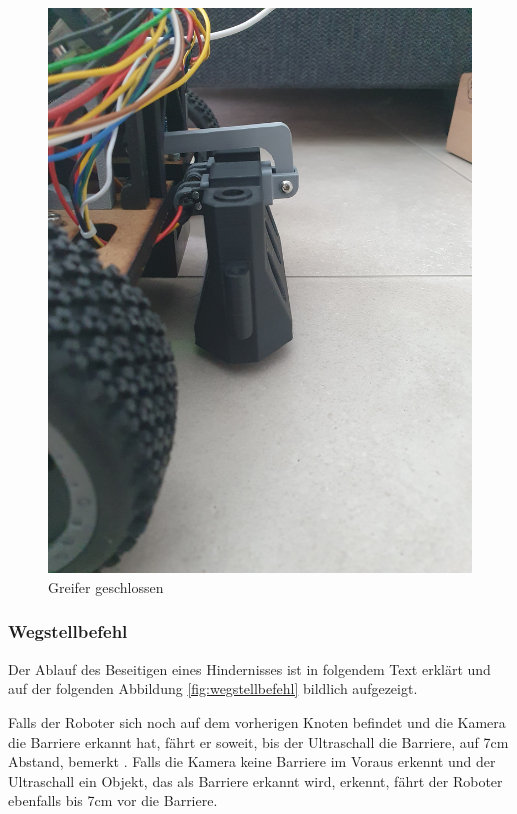 \begin{figure}[H]
\begin{minipage}[b]{0.49\textwidth}
  \includegraphics[width=\textwidth, angle=-90]{assets/MT/greifer-close.jpg}
  \caption{Greifer geschlossen}
  \label{fig:griefe-rclose1}
\end{minipage}
\end{figure}

\subsubsection{Wegstellbefehl}
\label{hindernis-um-befehl}

Der Ablauf des Beseitigen eines Hindernisses ist in folgendem Text erklärt und auf der folgenden Abbildung \ref{fig:wegstellbefehl} bildlich aufgezeigt.

Falls der Roboter sich noch auf dem vorherigen Knoten befindet und die Kamera die Barriere erkannt hat, fährt er soweit, bis der Ultraschall die Barriere, auf 7cm Abstand, bemerkt . 
Falls die Kamera keine Barriere im Voraus erkennt und der Ultraschall ein Objekt, das als Barriere erkannt wird, erkennt, fährt der Roboter ebenfalls bis 7cm vor die Barriere.

